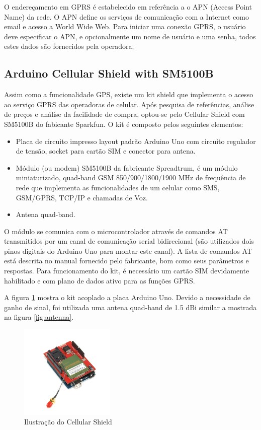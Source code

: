 O endereçamento em GPRS é estabelecido em referência a o APN (Access Point Name) da rede. O APN define os serviços de comunicação com a Internet como email e acesso a World Wide Web. Para iniciar uma conexão GPRS, o usuário deve especificar o APN, e opcionalmente um nome de usuário e uma senha, todos estes dados são fornecidos pela operadora. 

\subsection {Arduino Cellular Shield with SM5100B}

Assim como a funcionalidade GPS, existe um kit shield que implementa o acesso ao serviço GPRS das operadoras de celular. Após pesquisa de referências, análise de preços e análise da facilidade de compra, optou-se pelo Cellular Shield com SM5100B do fabicante Sparkfun. O kit é composto pelos seguintes elementos:

\begin{itemize}
	\item Placa de circuito impresso layout padrão Arduino Uno com circuito regulador de tensão, socket para cartão SIM e conector para antena.
	\item Módulo (ou modem) SM5100B da fabricante Spreadtrum, é um módulo miniaturizado, quad-band GSM 850/900/1800/1900 MHz de frequência de rede que implementa as funcionalidades de um celular como SMS, GSM/GPRS, TCP/IP e chamadas de Voz.
	\item Antena quad-band.
\end{itemize}

O módulo se comunica com o microcontrolador através de comandos AT transmitidos por um canal de comunicação serial bidirecional (são utilizados dois pinos digitais do Arduino Uno para montar este canal). A lista de comandos AT está descrita no manual fornecido pelo fabricante, bom como seus parâmetros e respostas. Para funcionamento do kit, é necessário um cartão SIM devidamente habilitado e com plano de dados ativo para as funções GPRS.

 A figura \ref{fig:cellularshield} mostra o kit acoplado a placa Arduino Uno. Devido a necessidade de ganho de sinal, foi utilizada uma antena quad-band de 1.5 dBi similar a mostrada na figura \ref{fig:antenna}.

\begin{figure}[h!]
			\centering
			\includegraphics[width=0.4\textwidth]{figures/gsm.jpg}
			\caption{Ilustra\c{c}\~{a}o do Cellular Shield}
			\label{fig:cellularshield}
\end{figure}

